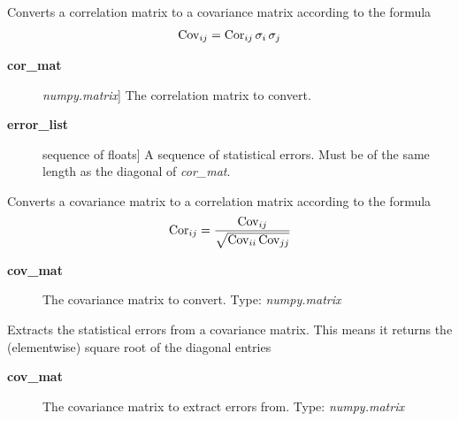 \documentclass[a4paper,10pt,english]{sphinxmanual}
\begin{document}
\begin{fulllineitems}
\label{index:kafe.numeric_tools.cor_to_cov}
Converts a correlation matrix to a covariance matrix according to the formula
\begin{gather}
\begin{split}\text{Cov}_{ij} = \text{Cor}_{ij}\, \sigma_i \, \sigma_j\end{split}\notag
\end{gather}\begin{description}
\item[{\textbf{cor\_mat}}] \leavevmode{[}\emph{numpy.matrix}{]}
The correlation matrix to convert.

\item[{\textbf{error\_list}}] \leavevmode{[}sequence of floats{]}
A sequence of statistical errors. Must be of the same length
as the diagonal of \emph{cor\_mat}.

\end{description}

\end{fulllineitems}


\begin{fulllineitems}
\label{index:kafe.numeric_tools.cov_to_cor}
Converts a covariance matrix to a correlation matrix according to the formula
\begin{gather}
\begin{split}\text{Cor}_{ij} = \frac{\text{Cov}_{ij}}{\sqrt{ \text{Cov}_{ii}\,\text{Cov}_{jj}}}\end{split}\notag
\end{gather}\begin{description}
\item[{\textbf{cov\_mat}}] \leavevmode
The covariance matrix to convert. Type: \emph{numpy.matrix}

\end{description}

\end{fulllineitems}


\begin{fulllineitems}
\label{index:kafe.numeric_tools.extract_statistical_errors}
Extracts the statistical errors from a covariance matrix. This means
it returns the (elementwise) square root of the diagonal entries
\begin{description}
\item[{\textbf{cov\_mat}}] \leavevmode
The covariance matrix to extract errors from. Type: \emph{numpy.matrix}

\end{description}

\end{fulllineitems}
\end{document}
